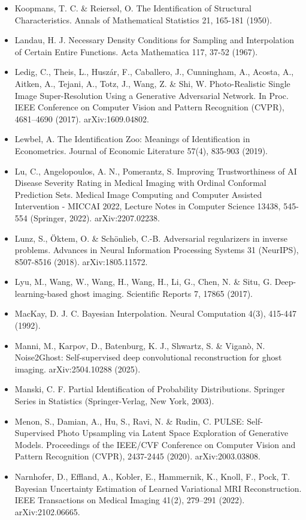 \documentclass[11pt]{article}
\begin{document}
\begin{itemize}
\item Koopmans, T. C. \& Reiersøl, O. The Identification of Structural Characteristics. Annals of Mathematical Statistics 21, 165-181 (1950).
\item Landau, H. J. Necessary Density Conditions for Sampling and Interpolation of Certain Entire Functions. Acta Mathematica 117, 37-52 (1967).
\item Ledig, C., Theis, L., Huszár, F., Caballero, J., Cunningham, A., Acosta, A., Aitken, A., Tejani, A., Totz, J., Wang, Z. \& Shi, W. Photo-Realistic Single Image Super-Resolution Using a Generative Adversarial Network. In Proc. IEEE Conference on Computer Vision and Pattern Recognition (CVPR), 4681--4690 (2017). arXiv:1609.04802.
\item Lewbel, A. The Identification Zoo: Meanings of Identification in Econometrics. Journal of Economic Literature 57(4), 835-903 (2019).
\item Lu, C., Angelopoulos, A. N., Pomerantz, S. Improving Trustworthiness of AI Disease Severity Rating in Medical Imaging with Ordinal Conformal Prediction Sets. Medical Image Computing and Computer Assisted Intervention - MICCAI 2022, Lecture Notes in Computer Science 13438, 545-554 (Springer, 2022). arXiv:2207.02238.
\item Lunz, S., Öktem, O. \& Schönlieb, C.-B. Adversarial regularizers in inverse problems. Advances in Neural Information Processing Systems 31 (NeurIPS), 8507-8516 (2018). arXiv:1805.11572.
\item Lyu, M., Wang, W., Wang, H., Wang, H., Li, G., Chen, N. \& Situ, G. Deep-learning-based ghost imaging. Scientific Reports 7, 17865 (2017).
\item MacKay, D. J. C. Bayesian Interpolation. Neural Computation 4(3), 415-447 (1992).
\item Manni, M., Karpov, D., Batenburg, K. J., Shwartz, S. \& Viganò, N. Noise2Ghost: Self-supervised deep convolutional reconstruction for ghost imaging. arXiv:2504.10288 (2025).
\item Manski, C. F. Partial Identification of Probability Distributions. Springer Series in Statistics (Springer-Verlag, New York, 2003).
\item Menon, S., Damian, A., Hu, S., Ravi, N. \& Rudin, C. PULSE: Self-Supervised Photo Upsampling via Latent Space Exploration of Generative Models. Proceedings of the IEEE/CVF Conference on Computer Vision and Pattern Recognition (CVPR), 2437-2445 (2020). arXiv:2003.03808.
\item Narnhofer, D., Effland, A., Kobler, E., Hammernik, K., Knoll, F., Pock, T. Bayesian Uncertainty Estimation of Learned Variational MRI Reconstruction. IEEE Transactions on Medical Imaging 41(2), 279--291 (2022). arXiv:2102.06665.

\end{itemize}
\end{document}
